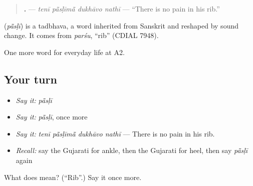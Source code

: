 \begin{quote}
\textbf{   .} — \emph{tenī pā̃sḷīmā̃ dukhāvo nathī} — \textquotedblleft{}There is no pain in his rib.\textquotedblright{}
\end{quote}

\begin{cousinweb}
\textbf{} (\emph{pā̃sḷī}) is a tadbhava, a word inherited from Sanskrit and reshaped by sound change. It comes from \emph{parśu}, \textquotedblleft{}rib\textquotedblright{} (CDIAL 7948).
\end{cousinweb}

\begin{grammarlens}[title={What you've built}]
One more word for everyday life at A2.
\end{grammarlens}

\subsection*{Your turn}
\begin{itemize}
\raggedright
  \item \emph{Say it:} \emph{pā̃sḷī}
  \item \emph{Say it:} \emph{pā̃sḷī}, once more
  \item \emph{Say it:} \emph{tenī pā̃sḷīmā̃ dukhāvo nathī} — There is no pain in his rib.
  \item \emph{Recall:} say the Gujarati for ankle, then the Gujarati for heel, then say \emph{pā̃sḷī} again
\end{itemize}

\begin{tcolorbox}[breakable,colback=teal!4,colframe=teal!35!black,title={Before you move on}]
What does  mean? (\textquotedblleft{}Rib\textquotedblright{}.) Say it once more.
\end{tcolorbox}

